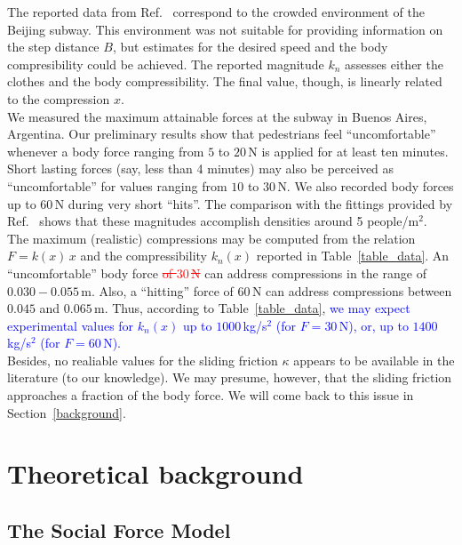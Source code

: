 \documentclass[preprint,12pt]{elsarticle}
\begin{document}
The reported data from Ref.~\cite{song_2019} correspond to the crowded 
environment of the Beijing subway. This environment was not suitable for 
providing information on the step distance $B$, but estimates for the 
desired speed and the body compresibility could be achieved. The reported 
magnitude $k_n$ assesses either the clothes and the body compressibility. The 
final value, though, is linearly related to the compression $x$. \\

We measured the maximum attainable forces at the subway in Buenos Aires, 
Argentina. Our preliminary results show that pedestrians feel ``uncomfortable'' 
whenever a body force ranging from $5$ to $20\,$N is applied for at least ten 
minutes. Short lasting forces (say, less than 4 minutes) may also be perceived 
as ``uncomfortable'' for values ranging from $10$ to $30\,$N. We also recorded body 
forces up to $60\,$N during very short ``hits''. The comparison with the 
fittings provided by Ref.~\cite{song_2019} shows that these magnitudes 
accomplish densities around 5 people/m$^2$.     \\    

The maximum (realistic) compressions may be computed from the relation 
$F=k(x)\,x$ and the compressibility $k_n(x)$ reported in Table~\ref{table_data}. 
An ``uncomfortable'' body force \textcolor{red}{\sout{of $30\,$N}} can address compressions in the 
range of $0.030-0.055\,$m. Also, a ``hitting'' force of $60\,$N can address 
compressions between $0.045$ and $0.065\,$m. Thus, according to 
Table~\ref{table_data}, \textcolor{blue}{we may expect experimental values for $k_n(x)$ up to 
$1000\,$kg/s$^2$ (for $F=30\,$N), or, up to $1400\,$kg/s$^2$ (for $F=60\,$N).} \\

Besides, no realiable values for the sliding friction $\kappa$ appears to be 
available in the literature (to our knowledge). We may presume, however, that 
the sliding friction approaches a fraction of the body force. We will come back 
to this issue in Section~\ref{background}. \\


\section{\label{background}Theoretical background}

\subsection{\label{sfm}The Social Force Model}
\end{document}
